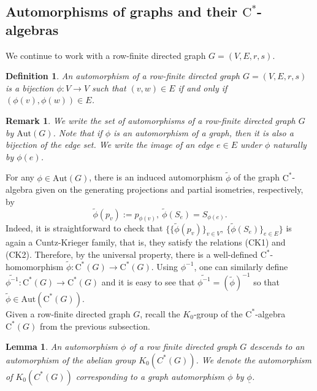 \documentclass[a4paper,11pt,reqno]{amsart}
\theoremstyle{plain}
\newtheorem{lem}[thm]{Lemma}
\newtheorem{defn}[thm]{Definition}
\newtheorem{rem}[thm]{Remark}
\theoremstyle{named}
\numberwithin{equation}{section}
\begin{document}
            \subsection{Automorphisms of graphs and their $\textrm{C}^{\ast}$-algebras} We continue to work with a row-finite directed graph $G=(V,E,r,s)$. \begin{defn}
                An automorphism of a row-finite directed graph $G=(V,E,r,s)$ is a bijection $\phi:V\rightarrow V$ such that $(v,w)\in E$ if and only if $(\phi(v),\phi(w))\in E$.
            \end{defn}
            \begin{rem}
                We write the set of automorphisms of a row-finite directed graph $G$ by $\textrm {Aut}(G)$. Note that if $\phi$ is an automorphism of a graph, then it is also a bijection of the edge set. We write the image of an edge $e\in E$ under $\phi$ naturally by $\phi(e)$.
            \end{rem}
            For any $\phi\in \textrm {Aut}(G)$, there is an induced automorphism $\widetilde{\phi}$ of the graph $\textrm{C}^{\ast}$-algebra given on the generating projections and partial isometries, respectively, by 
            \begin{displaymath}
                \widetilde{\phi}(p_{v}):=p_{\phi(v)}, \ \widetilde{\phi}(S_{e})=S_{\phi(e)}.
            \end{displaymath}
            Indeed, it is straightforward to check that $\{\{\widetilde{\phi}(p_{v})\}_{v\in V}, \  \{\widetilde{\phi}(S_{e})\}_{e\in E}\}$ is again a Cuntz-Krieger family, that is, they satisfy the relations (CK1) and (CK2). Therefore, by the universal property, there is a well-defined $\textrm{C}^{\ast}$-homomorphism $\widetilde{\phi}:\textrm{C}^{\ast}(G)\rightarrow \textrm{C}^{\ast}(G)$. Using $\phi^{-1}$, one can similarly define $\widetilde{\phi^{-1}}:\textrm{C}^{\ast}(G)\rightarrow \textrm{C}^{\ast}(G)$ and it is easy to see that $\widetilde{\phi^{-1}}=(\widetilde{\phi})^{-1}$ so that $\widetilde{\phi}\in\textrm {Aut}(\textrm{C}^{\ast}(G))$.\\
            \indent Given a row-finite directed graph $G$, recall the $K_{0}$-group of the $\textrm{C}^{\ast}$-algebra $\textrm{C}^{\ast}(G)$ from the previous subsection. 
            \begin{lem}
              An automorphism $\phi$ of a row finite directed graph $G$ descends to an automorphism of the abelian group $K_{0}(C^{\ast}(G))$. We denote the automorphism of $K_{0}(C^{\ast}(G))$ corresponding to a graph automorphism $\phi$ by $\underline{\phi}$.
            \end{lem}
\end{document}
